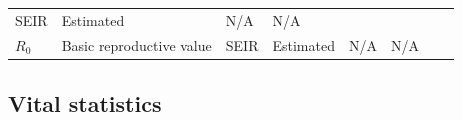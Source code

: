 \documentclass[10pt,letterpaper]{article}
\begin{document}
\begin{longtable}[]{@{}llllllll@{}}
\begin{minipage}[t]{0.05\columnwidth}
SEIR\strut
\end{minipage} & \begin{minipage}[t]{0.05\columnwidth}\raggedright\strut
Estimated\strut
\end{minipage} & \begin{minipage}[t]{0.04\columnwidth}\raggedright\strut
N/A\strut
\end{minipage} & \begin{minipage}[t]{0.04\columnwidth}\raggedright\strut
N/A\strut
\end{minipage} & \begin{minipage}[t]{0.14\columnwidth}\raggedright\strut
\strut
\end{minipage} & \begin{minipage}[t]{0.26\columnwidth}\raggedright\strut
\strut
\end{minipage}\tabularnewline
\begin{minipage}[t]{0.04\columnwidth}\raggedright\strut
\(R_0\)\strut
\end{minipage} & \begin{minipage}[t]{0.17\columnwidth}\raggedright\strut
Basic reproductive value\strut
\end{minipage} & \begin{minipage}[t]{0.05\columnwidth}\raggedright\strut
SEIR\strut
\end{minipage} & \begin{minipage}[t]{0.05\columnwidth}\raggedright\strut
Estimated\strut
\end{minipage} & \begin{minipage}[t]{0.04\columnwidth}\raggedright\strut
N/A\strut
\end{minipage} & \begin{minipage}[t]{0.04\columnwidth}\raggedright\strut
N/A\strut
\end{minipage} & \begin{minipage}[t]{0.14\columnwidth}\raggedright\strut
\strut
\end{minipage} & \begin{minipage}[t]{0.26\columnwidth}\raggedright\strut
\strut
\end{minipage}\tabularnewline
\bottomrule
\end{longtable}

\normalsize

\subsection{Vital statistics}\label{vital-statistics}
\end{document}
